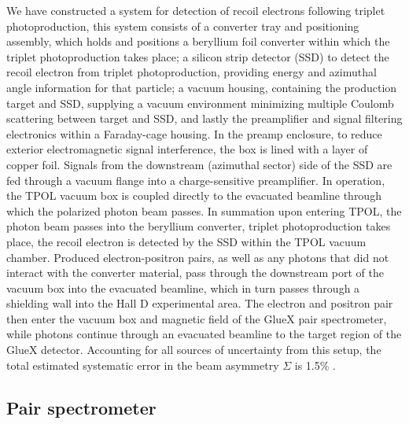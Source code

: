 We have constructed a system for detection of recoil electrons following triplet photoproduction, this system consists of a converter tray and positioning assembly,
which holds and positions a beryllium foil converter within which the triplet
photoproduction takes place; a silicon strip detector (SSD) to detect the recoil
electron from triplet photoproduction, providing energy and azimuthal
angle information for that particle; a vacuum housing, containing the production target and SSD, supplying a vacuum environment minimizing multiple Coulomb scattering
between target and SSD, and lastly the preamplifier and signal filtering electronics
within a Faraday-cage housing.
In the preamp enclosure, to reduce exterior electromagnetic signal interference,
the box is lined with a layer of copper foil. Signals from the downstream (azimuthal sector)
side of the SSD are fed through a vacuum flange into a charge-sensitive preamplifier.
In operation, the TPOL vacuum box is coupled directly to the evacuated
beamline through which the polarized photon beam passes. In summation upon entering
TPOL, the photon beam passes into the beryllium converter, triplet photoproduction takes
place, the recoil electron is detected by the SSD within the TPOL vacuum chamber.
Produced electron-positron pairs, as well as any photons that did not interact with the converter material, pass through the downstream port of the vacuum box into the evacuated
beamline, which in turn passes through a shielding wall into the Hall D experimental area. The electron and positron pair then enter the vacuum box and magnetic field of the GlueX pair
spectrometer, while photons continue through an evacuated beamline to the target region of
the GlueX detector.
Accounting for all sources of uncertainty from this setup, the total estimated systematic
error in the beam asymmetry $\Sigma$ is 1.5\% \cite{DUGGER2017115}.

\subsection{Pair spectrometer  \label{sec:ps}}


